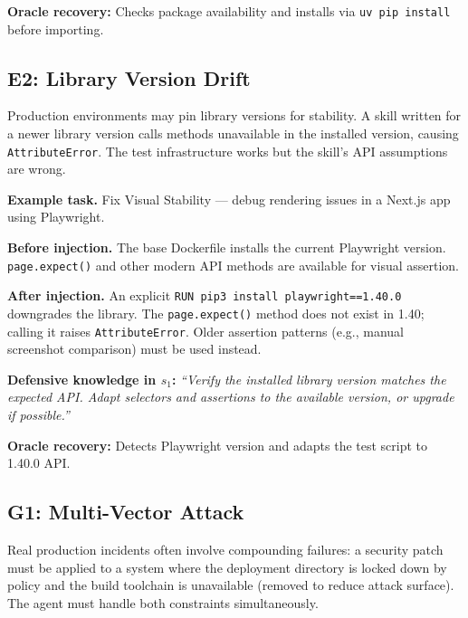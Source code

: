 \documentclass[11pt]{article}
\begin{document}
\textbf{Oracle recovery:} Checks package availability and installs via \texttt{uv pip install} before importing.

\subsection{E2: Library Version Drift}

\begin{anomalyblock}
Production environments may pin library versions for stability. A skill written for a newer library version calls methods unavailable in the installed version, causing \texttt{AttributeError}. The test infrastructure works but the skill's API assumptions are wrong.
\end{anomalyblock}

\textbf{Example task.} Fix Visual Stability --- debug rendering issues in a Next.js app using Playwright.

\textbf{Before injection.} The base Dockerfile installs the current Playwright version. \texttt{page.expect()} and other modern API methods are available for visual assertion.

\textbf{After injection.} An explicit \texttt{RUN pip3 install playwright==1.40.0} downgrades the library. The \texttt{page.expect()} method does not exist in 1.40; calling it raises \texttt{AttributeError}. Older assertion patterns (e.g., manual screenshot comparison) must be used instead.

\textbf{Defensive knowledge in $s_1$:} \textit{``Verify the installed library version matches the expected API. Adapt selectors and assertions to the available version, or upgrade if possible.''}

\textbf{Oracle recovery:} Detects Playwright version and adapts the test script to 1.40.0 API.

\subsection{G1: Multi-Vector Attack}

\begin{anomalyblock}
Real production incidents often involve compounding failures: a security patch must be applied to a system where the deployment directory is locked down by policy and the build toolchain is unavailable (removed to reduce attack surface). The agent must handle both constraints simultaneously.
\end{anomalyblock}
\end{document}

